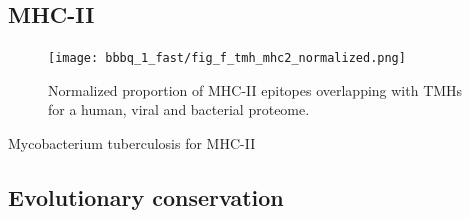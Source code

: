 %   

%   

\subsection{MHC-II}

\begin{figure}[!htbp]
  \texttt{[image: bbbq\_1\_fast/fig\_f\_tmh\_mhc2\_normalized.png]}
  \caption{
    Normalized proportion of MHC-II epitopes overlapping with TMHs
    for a human, viral and bacterial proteome.
  }
  \label{fig:f_tmh_mhc2_normalized}
\end{figure}



%   

%   
      Mycobacterium tuberculosis for MHC-II

\subsection{Evolutionary conservation}

